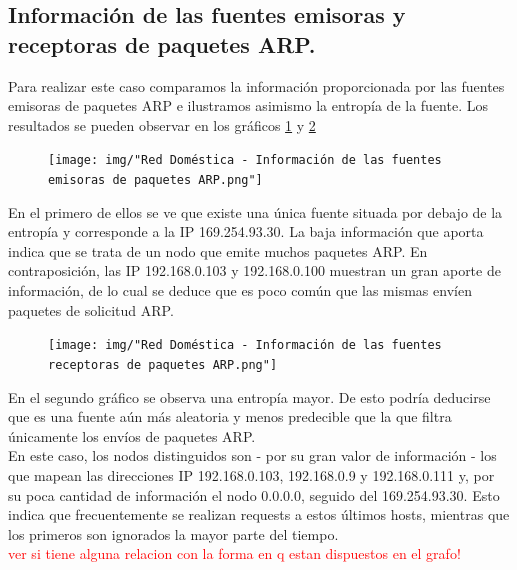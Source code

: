 
\subsection{Información de las fuentes emisoras y receptoras de paquetes ARP.}

Para realizar este caso comparamos la información proporcionada por las fuentes emisoras de paquetes ARP e ilustramos asimismo la entropía de la fuente. Los resultados se pueden observar en los gráficos \ref{domestica:emisoras} y \ref{domestica:receptoras}

\begin{figure}[h!]
    \centering                                                       
    \texttt{[image: img/"Red Doméstica - Información de las fuentes emisoras de paquetes ARP.png"]}
    \caption{}
    \label{domestica:emisoras}
\end{figure}

En el primero de ellos se ve que existe una única fuente situada por debajo de la entropía y corresponde a la IP 169.254.93.30. La baja información que aporta indica que se trata de un nodo que emite muchos paquetes ARP. En contraposición, las IP 192.168.0.103 y 192.168.0.100 muestran un gran aporte de información, de lo cual se deduce que es poco común que las mismas envíen paquetes de solicitud ARP.


\begin{figure}[h!]
    \centering                                                       
    \texttt{[image: img/"Red Doméstica - Información de las fuentes receptoras de paquetes ARP.png"]}
    \caption{}
    \label{domestica:receptoras}
\end{figure}

En el segundo gráfico se observa una entropía mayor. De esto podría deducirse que es una fuente aún más aleatoria y menos predecible que la que filtra únicamente los envíos de paquetes ARP.\\
En este caso, los nodos distinguidos son - por su gran valor de información - los que mapean las direcciones IP 192.168.0.103, 192.168.0.9 y 192.168.0.111 y, por su poca cantidad de información el nodo 0.0.0.0, seguido del 169.254.93.30. Esto indica que frecuentemente se realizan requests a estos últimos hosts, mientras que los primeros son ignorados la mayor parte del tiempo. \\
\textcolor{red}{ver si tiene alguna relacion con la forma en q estan dispuestos en el grafo!}

